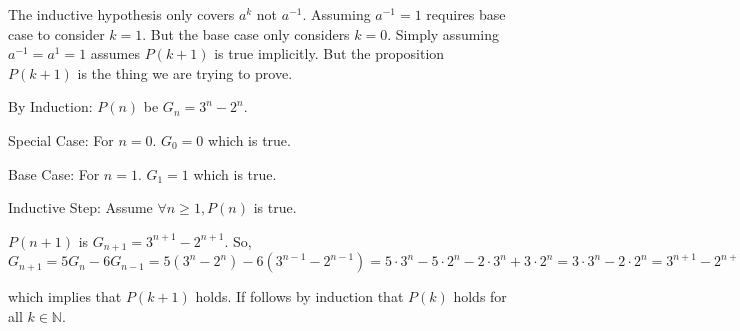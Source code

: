 \documentclass[titlepage,12pt]{book}
\begin{document}
\begin{solution}
    The inductive hypothesis only covers $a^{k}$ not $a^{-1}$.
    Assuming $a^{-1} = 1$ requires base case to consider $k = 1$.
    But the base case only considers $k = 0$.
    Simply assuming $a^{-1} = a^{1} = 1$ assumes $P(k + 1)$ is true implicitly.
    But the proposition $P(k + 1)$ is the thing we are trying to prove.
\end{solution}

\begin{solution}
    By Induction:
    $P(n)$ be $G_{n} = 3^{n} - 2^{n}$.

    Special Case: For $n = 0$. $G_{0} = 0$ which is true.

    Base Case: For $n = 1$. $G_{1} = 1$ which is true.

    Inductive Step: Assume $\forall n \geq 1, P(n)$ is true.

    $P(n + 1)$ is $G_{n + 1} = 3^{n+1} - 2^{n + 1}$.
    So, $G_{n + 1} = 5 G_{n} - 6 G_{n - 1} 
    = 5 (3^{n} - 2^{n}) - 6 (3^{n - 1} - 2^{n - 1})
    = 5 \cdot 3^{n} - 5 \cdot 2^{n} - 2 \cdot 3^{n} + 3 \cdot 2^{n}
    = 3 \cdot 3^{n} - 2 \cdot 2^{n}
    = 3^{n + 1} - 2^{n + 1}
    $

    which implies that $P(k + 1)$ holds.
    If follows by induction that $P(k)$ holds for all $k \in \mathbb{N}$.


\end{solution}
\end{document}
